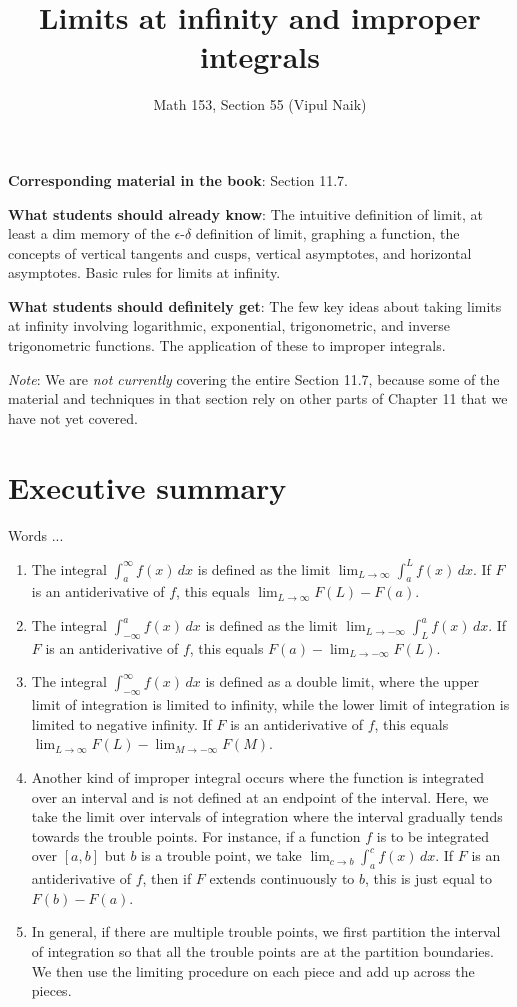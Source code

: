 \documentclass[10pt]{amsart}
\title{Limits at infinity and improper integrals}
\author{Math 153, Section 55 (Vipul Naik)}
\begin{document}
\maketitle

{\bf Corresponding material in the book}: Section 11.7.

{\bf What students should already know}: The intuitive definition of
limit, at least a dim memory of the $\epsilon$-$\delta$ definition of
limit, graphing a function, the concepts of vertical tangents and
cusps, vertical asymptotes, and horizontal asymptotes. Basic rules for
limits at infinity.

{\bf What students should definitely get}: The few key ideas about
taking limits at infinity involving logarithmic, exponential,
trigonometric, and inverse trigonometric functions. The application of
these to improper integrals.

{\em Note}: We are {\em not currently} covering the entire Section
11.7, because some of the material and techniques in that section rely
on other parts of Chapter 11 that we have not yet covered.

\section*{Executive summary}

Words ...

\begin{enumerate}
\item The integral $\int_a^\infty f(x) \, dx$ is defined as the limit
  $\lim_{L \to \infty} \int_a^L f(x) \, dx$. If $F$ is an
  antiderivative of $f$, this equals $\lim_{L \to \infty} F(L) - F(a)$.
\item The integral $\int_{-\infty}^a f(x) \, dx$ is defined as the
  limit $\lim_{L \to -\infty} \int_L^a f(x) \, dx$. If $F$ is an
  antiderivative of $f$, this equals $F(a) - \lim_{L \to -\infty} F(L)$.
\item The integral $\int_{-\infty}^\infty f(x) \, dx$ is defined as a
  double limit, where the upper limit of integration is limited to
  infinity, while the lower limit of integration is limited to
  negative infinity. If $F$ is an antiderivative of $f$, this equals
  $\lim_{L \to \infty} F(L) - \lim_{M \to -\infty} F(M)$.
\item Another kind of improper integral occurs where the function is
  integrated over an interval and is not defined at an endpoint of the
  interval. Here, we take the limit over intervals of integration
  where the interval gradually tends towards the trouble points. For
  instance, if a function $f$ is to be integrated over $[a,b]$ but $b$
  is a trouble point, we take $\lim_{c \to b} \int_a^c f(x) \, dx$. If
  $F$ is an antiderivative of $f$, then if $F$ extends continuously to
  $b$, this is just equal to $F(b) - F(a)$.
\item In general, if there are multiple trouble points, we first
  partition the interval of integration so that all the trouble points
  are at the partition boundaries. We then use the limiting procedure
  on each piece and add up across the pieces.
\end{enumerate}
\end{document}
